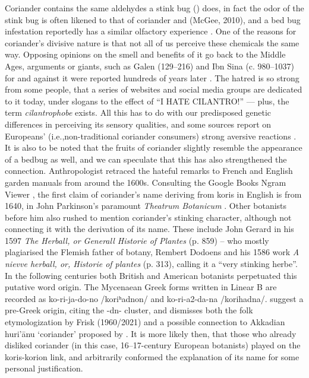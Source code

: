 Coriander contains the same aldehydes a stink bug () does, in fact the odor of the stink bug is often likened to that of coriander and (McGee, 2010), and a bed bug infestation reportedly has a similar olfactory experience \parencite{davidson_oxford_2014}. One of the reasons for coriander’s divisive nature is that not all of us perceive these chemicals the same way. Opposing opinions on the smell and benefits of it go back to the Middle Ages, arguments or giants, such as Galen (129--216) and Ibn Sina (c. 980--1037) for and against it were reported hundreds of years later \parencite[cf.][]{parkinson_theatrum_1640}. The hatred is so strong from some people, that a series of websites and social media groups are dedicated to it today, under slogans to the effect of “I HATE CILANTRO!” — plus, the term \emph{cilantrophobe} exists. All this has to do with our predisposed genetic differences in perceiving its sensory qualities, and some sources report on Europeans’ (i.e.,non-traditional coriander consumers) strong aversive reactions \parencite{eriksson_genetic_2012}. It is also to be noted that the fruits of coriander slightly resemble the appearance of a bedbug as well, and we can speculate that this has also strengthened the connection. Anthropologist \textcite{leach_rehabilitating_2001} retraced the hateful remarks to French and English garden manuals from around the 1600s.
Consulting the Google Books Ngram Viewer \parencite{michel_quantitative_2011}, the first claim of coriander’s name deriving from koris in English is from 1640, in John Parkinson’s paramount \textit{Theatrum Botanicum} \parencite[918-919]{parkinson_theatrum_1640}. Other botanists before him also rushed to mention coriander’s stinking character, although not connecting it with the derivation of its name. These include John Gerard in his 1597 \textit{The Herball, or Generall Historie of Plantes} (p. 859) – who mostly plagiarised the Flemish father of botany, Rembert Dodoens and his 1586 work \textit{A nievve herball, or, Historie of plantes} (p. 313), calling it a “very stinking herbe”. In the following centuries both British and American botanists perpetuated this putative word origin. The Mycenaean Greek forms written in Linear B are recorded as ko-ri-ja-do-no /koriʰadnon/ and ko-ri-a2-da-na /korihadna/. \textcite[754]{beekes_etymological_2010} suggest a pre-Greek origin, citing the -dn- cluster, and dismisses both the folk etymologization by \textcite{frisk_griechisches_2021} Frisk (1960/2021) and a possible connection to Akkadian huri’ānu ‘coriander’ proposed by \textcite{szemerenyi_review_1971}. It is more likely then, that those who already disliked coriander (in this case, 16--17-century European botanists) played on the koris-korion link, and arbitrarily conformed the explanation of its name for some personal justification.
